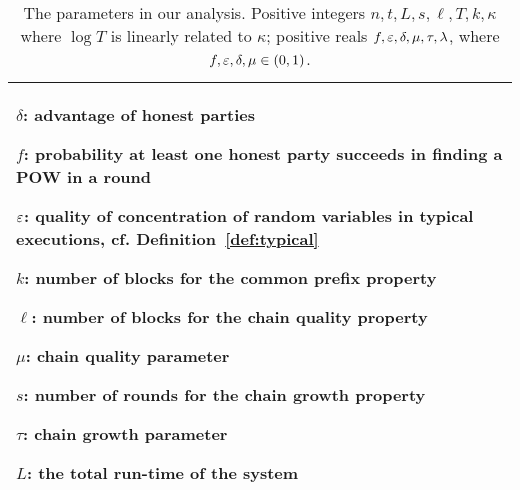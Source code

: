 \begin{table}
\begin{center}
\begin{tabular}{|p{\columnwidth}|}
\hline
$\delta$: advantage of honest parties%

$f$: probability at least one honest party succeeds in finding a POW in a round

$\varepsilon$: quality of concentration of random variables in typical executions,
cf. Definition~\ref{def:typical}

$k$: number of blocks for the common prefix property

$\ell$: number of blocks for the chain quality property

$\mu$: chain quality parameter

$s$:  number of rounds for the chain growth property

$\tau$: chain growth parameter

$L$: the total run-time of the system \\

\hline
\end{tabular}
\end{center}
\caption{\label{tab:requirements}
The parameters in our analysis. Positive integers $n,t,L,s,\ell,T,k,\kappa$ where $\log T$ is linearly related to $\kappa$; positive reals
$f,\varepsilon,\delta,\mu,\tau,\lambda$, where $f,\varepsilon,\delta,\mu\in(0,1)$.}
\end{table}%

